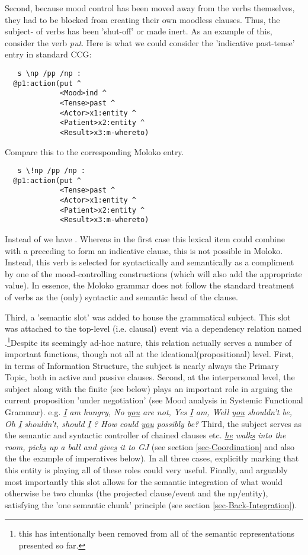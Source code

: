 Second, because mood control has been moved away from the verbs themselves, they had to be blocked from creating their own moodless clauses. Thus, the subject- of verbs has been 'shut-off' or made inert. As an example of this, consider the verb \emph{put}. Here is what we could consider the 'indicative past-tense' entry in standard CCG:
\begin{verbatim}
   s \np /pp /np : 
  @p1:action(put ^ 
             <Mood>ind ^ 
             <Tense>past ^ 
             <Actor>x1:entity ^ 
             <Patient>x2:entity ^ 
             <Result>x3:m-whereto)
\end{verbatim}
Compare this to the corresponding Moloko entry.
\begin{verbatim}
   s \!np /pp /np : 
  @p1:action(put ^ 
             <Tense>past ^ 
             <Actor>x1:entity ^ 
             <Patient>x2:entity ^ 
             <Result>x3:m-whereto)
\end{verbatim}
Instead of  we have . Whereas in the first case this lexical item could combine with a preceding  to form an indicative clause, this is not possible in Moloko. Instead, this verb is selected for syntactically and semantically as a compliment by one of the mood-controlling constructions (which will also add the appropriate  value). In essence, the Moloko grammar does not follow the standard treatment of verbs as the (only) syntactic and semantic head of the clause.

Third, a 'semantic slot' was added to house the grammatical subject. This slot was attached to the top-level (i.e. clausal) event via a dependency relation named .\footnote{this has intentionally been removed from all of the semantic representations presented so far.}Despite its seemingly ad-hoc nature, this relation actually serves a number of important functions, though not all at  the ideational(propositional) level. First, in terms of Information Structure, the subject is nearly always the Primary Topic, both in active and passive clauses.  Second, at the interpersonal level, the subject along with the finite (see below) plays an important role in arguing the current proposition 'under negotiation' (see Mood analysis in Systemic Functional Grammar). e.g. \emph{\underline{I} am hungry, No \underline{you}  are not, Yes \underline{I} am, Well \underline{you} shouldn't be, Oh \underline{I} shouldn't, should \underline{I} ? How could \underline{you} possibly be?} Third, the subject serves as the semantic and syntactic controller of chained clauses etc.  \emph{\underline{he} walk\underline{s} into the room, pick\underline{s} up a ball and give\underline{s} it to GJ} (see section \ref{sec-Coordination} and also the the example of imperatives below). In all three cases, explicitly marking that this entity is playing all of these roles could very useful. Finally, and arguably most importantly this slot allows for the semantic integration of what would otherwise be two chunks (the projected clause/event and the np/entity), satisfying the 'one semantic chunk' principle (see section \ref{sec-Back-Integration}).


